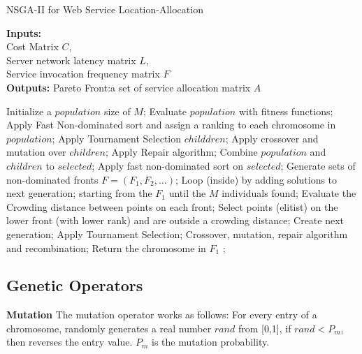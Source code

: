 \begin{algorithm}[!htb]
	\caption{NSGA-II for Web Service Location-Allocation}
	\footnotesize
	\label{alg:NSGA2}
	\textbf{Inputs:} \\
		Cost Matrix $C$, \\ 
		Server network latency matrix $L$, \\
		Service invocation frequency matrix $F$ \\

	\textbf{Outputs:}
		Pareto Front:a  set of service allocation matrix $A$

	\begin{algorithmic}[1]
		\State Initialize a $population$ size of $M$;
		\State Evaluate $population$ with fitness functions;
		\State Apply Fast Non-dominated sort and assign a ranking to each chromosome in $population$;
		\State Apply Tournament Selection $childdren$;
		\State Apply crossover and mutation  over $children$;
		\State Apply Repair algorithm;
		\State Combine $population$ and $children$ to $selected$;
		    \State Apply fast non-dominated sort on $selected$;
		    \State Generate sets of non-dominated fronts $F = (F_1, F_2, \dots)$;
		    \State Loop (inside) by adding solutions to next generation;
		    \State starting from the $F_1$ until the $M$ individuals found;
		    \State Evaluate the Crowding distance between points on each front;
		    \State Select points (elitist) on the lower front (with lower rank) and are outside a crowding distance;
		    \State Create next generation;
		    \State Apply Tournament Selection;
		    \State Crossover, mutation, repair algorithm and recombination;
		\EndWhile
		\State Return the chromosome in $F_1$ ;
	\end{algorithmic}
\end{algorithm}



\subsection{Genetic Operators}
% 

\begin{flushleft}\textbf{Mutation} The mutation operator works as follows: For every entry of a chromosome, randomly generates a real number $rand$ from [0,1],
 if $rand < P_m$, then reverses the entry value. $P_m$ is the mutation probability.
\end{flushleft}

